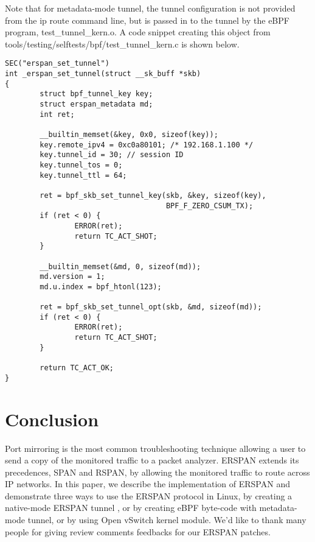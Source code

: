 \documentclass[10pt]{sigplanconf}
\newcommand{\mycomment}[1]{}
\begin{document}
Note that for metadata-mode tunnel, the tunnel configuration is not
provided from the ip route command line, but is passed in to the tunnel
by the eBPF program, test\_tunnel\_kern.o. A code snippet creating this
object from tools/testing/selftests/bpf/test\_tunnel\_kern.c is shown below.
{\scriptsize
\begin{verbatim}
SEC("erspan_set_tunnel")
int _erspan_set_tunnel(struct __sk_buff *skb)
{
        struct bpf_tunnel_key key;
        struct erspan_metadata md; 
        int ret;

        __builtin_memset(&key, 0x0, sizeof(key));
        key.remote_ipv4 = 0xc0a80101; /* 192.168.1.100 */
        key.tunnel_id = 30; // session ID
        key.tunnel_tos = 0;
        key.tunnel_ttl = 64;

        ret = bpf_skb_set_tunnel_key(skb, &key, sizeof(key),
                                     BPF_F_ZERO_CSUM_TX);
        if (ret < 0) {
                ERROR(ret);
                return TC_ACT_SHOT;
        }

        __builtin_memset(&md, 0, sizeof(md));
        md.version = 1;
        md.u.index = bpf_htonl(123);

        ret = bpf_skb_set_tunnel_opt(skb, &md, sizeof(md));
        if (ret < 0) {
                ERROR(ret);
                return TC_ACT_SHOT;
        }

        return TC_ACT_OK;
}
\end{verbatim}
}
\section{Conclusion}
Port mirroring is the most common troubleshooting technique
allowing a user to send a copy of the monitored traffic to a packet analyzer.
ERSPAN extends its precedences, SPAN and RSPAN, by allowing the monitored
traffic to route across IP networks.
In this paper, we describe the implementation of ERSPAN and demonstrate three
ways to use the ERSPAN protocol in Linux, by creating a native-mode ERSPAN tunnel
, or by creating eBPF byte-code with metadata-mode tunnel, or by using Open
vSwitch kernel module. 
We'd like to thank many people for giving review comments feedbacks for our
ERSPAN patches.


\mycomment{
\section{Acknowledgments}
The authors would like to acknowledge Justin Pettit for his guidance on writing
this paper, Martynas Pumputis for providing context around WeaveNet, and Ben
Pfaff, Hannes Sowa and Yingying Ren for providing review feedback.
\section{Author Biography}
Joe Stringer is a software engineer interested in networks and related fields,
in particular SDN. He is actively engaged in the open-source community on
network software projects including Open vSwitch and the Linux networking
stack.
}


\end{document}
